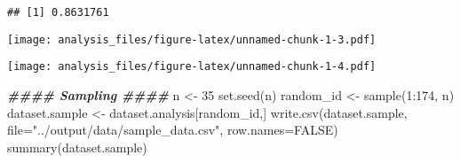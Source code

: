 \documentclass[
]{article}
\newenvironment{Shaded}{\begin{snugshade}}{\end{snugshade}}
\newcommand{\AttributeTok}[1]{\textcolor[rgb]{0.77,0.63,0.00}{#1}}
\newcommand{\CommentTok}[1]{\textcolor[rgb]{0.56,0.35,0.01}{\textit{#1}}}
\newcommand{\ConstantTok}[1]{\textcolor[rgb]{0.00,0.00,0.00}{#1}}
\newcommand{\DecValTok}[1]{\textcolor[rgb]{0.00,0.00,0.81}{#1}}
\newcommand{\DocumentationTok}[1]{\textcolor[rgb]{0.56,0.35,0.01}{\textbf{\textit{#1}}}}
\newcommand{\FunctionTok}[1]{\textcolor[rgb]{0.00,0.00,0.00}{#1}}
\newcommand{\NormalTok}[1]{#1}
\newcommand{\OtherTok}[1]{\textcolor[rgb]{0.56,0.35,0.01}{#1}}
\newcommand{\SpecialCharTok}[1]{\textcolor[rgb]{0.00,0.00,0.00}{#1}}
\newcommand{\StringTok}[1]{\textcolor[rgb]{0.31,0.60,0.02}{#1}}
\begin{document}
\begin{verbatim}
## [1] 0.8631761
\end{verbatim}

\begin{Shaded}
\end{Shaded}

\texttt{[image: analysis\_files/figure-latex/unnamed-chunk-1-3.pdf]}

\begin{Shaded}
\end{Shaded}

\texttt{[image: analysis\_files/figure-latex/unnamed-chunk-1-4.pdf]}

\begin{Shaded}
\begin{Highlighting}[]
\DocumentationTok{\#\#\#\# Sampling \#\#\#\#}
\NormalTok{n }\OtherTok{\textless{}{-}} \DecValTok{35}
\FunctionTok{set.seed}\NormalTok{(n)}
\NormalTok{random\_id }\OtherTok{\textless{}{-}} \FunctionTok{sample}\NormalTok{(}\DecValTok{1}\SpecialCharTok{:}\DecValTok{174}\NormalTok{, n)}
\NormalTok{dataset.sample }\OtherTok{\textless{}{-}}\NormalTok{ dataset.analysis[random\_id,]}
\FunctionTok{write.csv}\NormalTok{(dataset.sample, }\AttributeTok{file=}\StringTok{"../output/data/sample\_data.csv"}\NormalTok{, }\AttributeTok{row.names=}\ConstantTok{FALSE}\NormalTok{)}
\FunctionTok{summary}\NormalTok{(dataset.sample)}
\end{Highlighting}
\end{Shaded}
\end{document}
